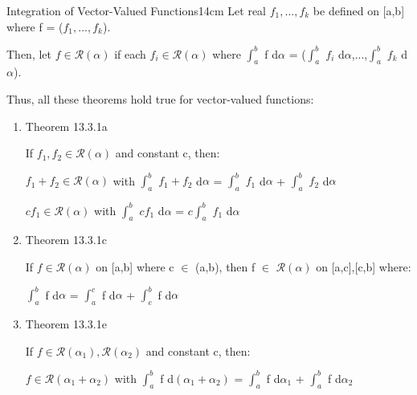     \begin{definition}{Integration of Vector-Valued Functions}{14cm}
        Let real $f_1,...,f_k$ be defined on [a,b] where f = ($f_1,...,f_k$).

        Then, let $f \in \mathscr{R}(\alpha)$ if each $f_i \in \mathscr{R}(\alpha)$
        where $\int_a^b$ f d$\alpha$
        = ($\int_a^b$ $f_i$ d$\alpha$,...,$\int_a^b$ $f_k$ d$\alpha$).

        \vspace{0.2cm}

        Thus, all these theorems hold true for vector-valued functions:

        \begin{enumerate}[label=(\alph*), leftmargin=1.5cm, itemsep=0.1cm]
            \item {\color{red} Theorem 13.3.1a}
            
                If $f_1,f_2 \in \mathscr{R}(\alpha)$ and constant c, then:

                \hspace{0.5cm}
                $f_1 + f_2 \in \mathscr{R}(\alpha)$ with
                $\int_a^b$ $f_1 + f_2$ d$\alpha$
                = $\int_a^b$ $f_1$ d$\alpha$ + $\int_a^b$ $f_2$ d$\alpha$

                \hspace{0.5cm}
                $cf_1 \in \mathscr{R}(\alpha)$ with
                $\int_a^b$ $cf_1$ d$\alpha$
                = $c\int_a^b$ $f_1$ d$\alpha$

            \item {\color{red} Theorem 13.3.1c}

                If $f \in \mathscr{R}(\alpha)$ on [a,b] where c $\in$ (a,b), then
                f $\in$ $\mathscr{R}(\alpha)$ on [a,c],[c,b] where:
                
                \hspace{0.5cm}
                $\int_a^b$ f d$\alpha$
                = $\int_a^c$ f d$\alpha$ + $\int_c^b$ f d$\alpha$

            \item {\color{red} Theorem 13.3.1e}

                If $f \in \mathscr{R}(\alpha_1),\mathscr{R}(\alpha_2)$ and
                constant c, then:

                \hspace{0.5cm}
                $f \in \mathscr{R}(\alpha_1+\alpha_2)$ with
                $\int_a^b$ f d$(\alpha_1+\alpha_2)$
                = $\int_a^b$ f d$\alpha_1$ + $\int_a^b$ f d$\alpha_2$


\end{enumerate}
\end{definition}
